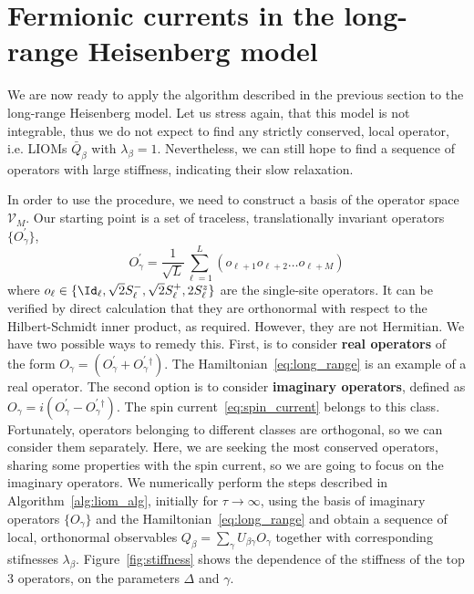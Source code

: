 \section{Fermionic currents in the long-range Heisenberg model \label{sec:fermionic_currents}}

We are now ready to apply the algorithm described in the previous section to the long-range Heisenberg model.
Let us stress again, that this model is not integrable, thus we do not expect to find any
strictly conserved, local operator, i.e. LIOMs \(\bar{Q}_{\beta}\) with \(\lambda_{\beta} = 1\).
Nevertheless, we can still hope to find a sequence of operators with large stiffness,
indicating their slow relaxation.

In order to use the procedure, we need to construct a basis of the operator space \(\mathcal{V}_M\).
Our starting point is a set of traceless, translationally invariant operators \(\{O^{\prime}_{\gamma}\}\),
\begin{equation}
  O^{\prime}_{\gamma} = \frac{1}{\sqrt{L}}\sum_{\ell=1}^L\left( o_{\ell+1}o_{\ell+2}\ldots o_{\ell+M} \right)
  \label{eq:operator_basis}
\end{equation}
where \(o_{\ell} \in \{\Id_{\ell}, \sqrt{2}\Sm_{\ell},\sqrt{2}\Sp_{\ell},2\Sz_{\ell}\}\) are the single-site operators.
It can be verified by direct calculation that they are orthonormal with respect to the Hilbert-Schmidt inner product,
as required. However, they are not Hermitian. We have two possible ways to remedy this. First, is
to consider \textbf{real operators} of the form \(O_{\gamma} = (O^{\prime}_{\gamma} + O^{\prime}_{\gamma}{}^{\dag})\).
The Hamiltonian~\eqref{eq:long_range} is an example of a real operator. The second option is to consider \textbf{imaginary operators},
defined as \(O_{\gamma} = i(O^{\prime}_{\gamma} - O^{\prime}_{\gamma}{}^{\dag})\). The spin current~\eqref{eq:spin_current}
belongs to this class. Fortunately, operators belonging to different classes are orthogonal, so we can
consider them separately. Here, we are seeking the most conserved operators, sharing some properties with
the spin current, so we are going to focus on the imaginary operators. We numerically perform the steps
described in Algorithm~\ref{alg:liom_alg}, initially for \(\tau\to\infty\), using the basis of imaginary operators \(\{O_{\gamma}\}\)
and the Hamiltonian~\eqref{eq:long_range} and obtain a sequence of local, orthonormal observables
\(Q_{\beta} = \sum_{\gamma} U_{\beta\gamma} O_{\gamma}\) together with corresponding stifnesses \(\lambda_{\beta}\).
Figure~\ref{fig:stiffness} shows the dependence of the stiffness of the top 3 operators, on the parameters \(\Delta\) and \(\gamma\).
